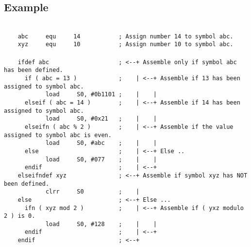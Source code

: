     \subsection{Example}
        ~\\
        {
            \fontsize{8pt}{10pt}\selectfont
            \verb'    abc     equ     14           ; Assign number 14 to symbol abc.'\\
            \verb'    xyz     equ     10           ; Assign number 10 to symbol abc.'\\
            \verb''\\
            \verb'    ifdef abc                    ; <--+ Assemble only if symbol abc has been defined.'\\
            \verb'      if ( abc = 13 )            ;    | <--+ Assemble if 13 has been assigned to symbol abc.'\\
            \verb'            load     S0, #0b1101 ;    |    |'\\
            \verb'      elseif ( abc = 14 )        ;    | <--+ Assemble if 14 has been assigned to symbol abc.'\\
            \verb'            load     S0, #0x21   ;    |    |'\\
            \verb'      elseifn ( abc % 2 )        ;    | <--+ Assemble if the value assigned to symbol abc is even.'\\
            \verb'            load     S0, #abc    ;    |    |'\\
            \verb'      else                       ;    | <--+ Else ..'\\
            \verb'            load     S0, #077    ;    |    |'\\
            \verb'      endif                      ;    | <--+'\\
            \verb'    elseifndef xyz               ; <--+ Assemble if symbol xyz has NOT been defined.'\\
            \verb'            clrr     S0          ;    |'\\
            \verb'    else                         ; <--+ Else ...'\\
            \verb'      ifn ( xyz mod 2 )          ;    | <--+ Assemble if ( yxz modulo 2 ) is 0.'\\
            \verb'            load     S0, #128    ;    |    |'\\
            \verb'      endif                      ;    | <--+'\\
            \verb'    endif                        ; <--+'
        }
